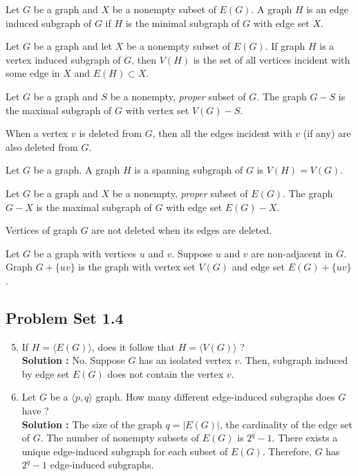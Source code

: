 \begin{definition}
	Let $G$ be a graph and $X$ be a nonempty subset of $E(G)$.
	A graph $H$ is an edge induced subgraph of $G$ if $H$ is the minimal subgraph of $G$ with edge set $X$.
\end{definition}
\begin{remark}
	Let $G$ be a graph and let $X$ be a nonempty subset of $E(G)$.
	If graph $H$ is a vertex induced subgraph of $G$, then $V(H)$ is the set of all vertices incident with some edge in $X$ and $E(H) \subset X$.
\end{remark}

\begin{definition}
	Let $G$ be a graph and $S$ be a nonempty, \textit{proper} subset of $G$.
	The graph $G-S$ is the maximal subgraph of $G$ with vertex set $V(G) - S$.
\end{definition}
\begin{remark}
	When a vertex $v$ is deleted from $G$, then all the edges incident with $v$ (if any) are also deleted from $G$.
\end{remark}

\begin{definition}
	Let $G$ be a graph.
	A graph $H$ is a spanning subgraph of $G$ is $V(H) = V(G)$.
\end{definition}

\begin{definition}
	Let $G$ be a graph and $X$ be a nonempty, \textit{proper} subset of $E(G)$.
	The graph $G-X$ is the maximal subgraph of $G$ with edge set $E(G)-X$.
\end{definition}
\begin{remark}
	Vertices of graph $G$ are not deleted when its edges are deleted.
\end{remark}

\begin{definition}
	Let $G$ be a graph with vertices $u$ and $v$.
	Suppose $u$ and $v$ are non-adjacent in $G$.
	Graph $G + \{uv\}$ is the graph with vertex set $V(G)$ and edge set $E(G)+\{uv\}$.
\end{definition}

\subsection*{Problem Set 1.4}
\begin{enumerate}
	\setcounter{enumi}{4}
	\item If $H = \langle E(G) \rangle$, does it follow that $H = \langle V(G) \rangle$ ?\\
		\textbf{Solution :}
		No.	
		Suppose $G$ has an isolated vertex $v$.
		Then, subgraph induced by edge set $E(G)$ does not contain the vertex $v$.
	\item Let $G$ be a $\langle p,q \rangle$ graph. How many different edge-induced subgraphs does $G$ have ?\\
		\textbf{Solution :}
		The size of the graph $q=|E(G)|$, the cardinality of the edge set of $G$.
		The number of nonempty subsets of $E(G)$ is $2^q-1$.
		There exists a unique edge-induced subgraph for each subset of $E(G)$.
		Therefore, $G$ has $2^q-1$ edge-induced subgraphs.
\end{enumerate}

